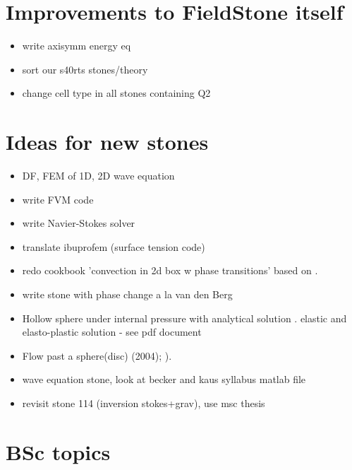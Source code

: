 \documentclass[a4paper]{article}
\begin{document}
\tableofcontents

\newpage
\section{Improvements to FieldStone itself}

\begin{itemize}
\item write axisymm energy eq 
\item sort our s40rts stones/theory
\item change cell type in all stones containing Q2
\end{itemize}

\newpage
\section{Ideas for new stones}

\begin{itemize}
\item DF, FEM of 1D, 2D wave equation
\item write FVM code
\item write Navier-Stokes solver
\item translate ibuprofem (surface tension code)
\item redo  cookbook 'convection in 2d box w phase transitions'
based on \textcite{chyu85}. 
\item write stone with phase change a la van den Berg \textcite{vava08}
\item Hollow sphere under internal pressure with analytical solution
. elastic and elasto-plastic solution  - see pdf document
\item Flow past a sphere(disc) \textcite{demj04} (2004); 
      \textcite{gafp17}). 
\item wave equation stone, look at becker and kaus syllabus matlab file
\item revisit stone 114 (inversion stokes+grav), use msc thesis 
\end{itemize}

\newpage
\section{BSc topics}
\end{document}
